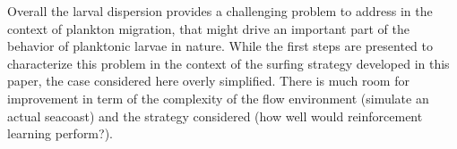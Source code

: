 Overall the larval dispersion provides a challenging problem to address in the context of plankton migration, that might drive an important part of the behavior of planktonic larvae in nature.
While the first steps are presented to characterize this problem in the context of the surfing strategy developed in this paper, the case considered here overly simplified.
There is much room for improvement in term of the complexity of the flow environment (simulate an actual seacoast) and the strategy considered (how well would reinforcement learning perform?).
